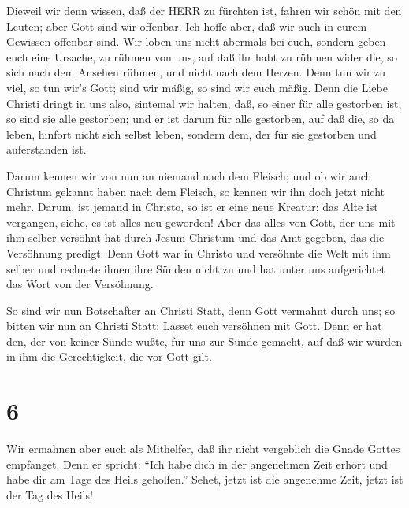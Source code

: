  Dieweil wir denn wissen, daß der HERR zu fürchten ist,
fahren wir schön mit den Leuten; aber Gott sind wir offenbar. Ich hoffe
aber, daß wir auch in eurem Gewissen offenbar sind.  Wir
loben uns nicht abermals bei euch, sondern geben euch eine Ursache, zu
rühmen von uns, auf daß ihr habt zu rühmen wider die, so sich nach dem
Ansehen rühmen, und nicht nach dem Herzen.  Denn tun wir zu
viel, so tun wir's Gott; sind wir mäßig, so sind wir euch mäßig.
 Denn die Liebe Christi dringt in uns also, sintemal wir
halten, daß, so einer für alle gestorben ist, so sind sie alle
gestorben;  und er ist darum für alle gestorben, auf daß
die, so da leben, hinfort nicht sich selbst leben, sondern dem, der für
sie gestorben und auferstanden ist.

 Darum kennen wir von nun an niemand nach dem Fleisch; und
ob wir auch Christum gekannt haben nach dem Fleisch, so kennen wir ihn
doch jetzt nicht mehr.  Darum, ist jemand in Christo, so
ist er eine neue Kreatur; das Alte ist vergangen, siehe, es ist alles
neu geworden!  Aber das alles von Gott, der uns mit ihm
selber versöhnt hat durch Jesum Christum und das Amt gegeben, das die
Versöhnung predigt.  Denn Gott war in Christo und versöhnte
die Welt mit ihm selber und rechnete ihnen ihre Sünden nicht zu und hat
unter uns aufgerichtet das Wort von der Versöhnung.

 So sind wir nun Botschafter an Christi Statt, denn Gott
vermahnt durch uns; so bitten wir nun an Christi Statt: Lasset euch
versöhnen mit Gott.  Denn er hat den, der von keiner Sünde
wußte, für uns zur Sünde gemacht, auf daß wir würden in ihm die
Gerechtigkeit, die vor Gott gilt.

\hypertarget{section-5}{%
\section{6}\label{section-5}}

 Wir ermahnen aber euch als Mithelfer, daß ihr nicht
vergeblich die Gnade Gottes empfanget.  Denn er spricht:
``Ich habe dich in der angenehmen Zeit erhört und habe dir am Tage des
Heils geholfen.'' Sehet, jetzt ist die angenehme Zeit, jetzt ist der Tag
des Heils!

